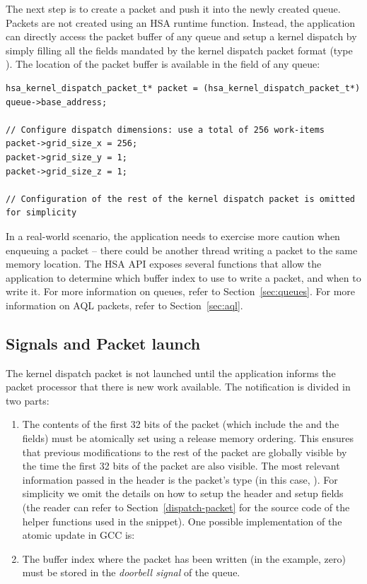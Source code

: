 \documentclass[final,oneside]{book}
\begin{document}
The next step is to create a packet and push it into the newly created
queue. Packets are not created using an HSA runtime function. Instead, the
application can directly access the packet buffer of any queue and setup a
kernel dispatch by simply filling all the fields mandated by the kernel dispatch
packet format (type ). The location of the
packet buffer is available in the  field of any
queue:
\begin{lstlisting}
hsa_kernel_dispatch_packet_t* packet = (hsa_kernel_dispatch_packet_t*) queue->base_address;

// Configure dispatch dimensions: use a total of 256 work-items
packet->grid_size_x = 256;
packet->grid_size_y = 1;
packet->grid_size_z = 1;

// Configuration of the rest of the kernel dispatch packet is omitted for simplicity
\end{lstlisting}

In a real-world scenario, the application needs to exercise more caution when
enqueuing a packet -- there could be another thread writing a packet to the same
memory location. The HSA API exposes several functions that allow the
application to determine which buffer index to use to write a packet, and when to
write it. For more information on queues, refer to Section~\ref{sec:queues}. For
more information on AQL packets, refer to Section~\ref{sec:aql}.

\subsection{Signals and Packet launch}
The kernel dispatch packet is not launched until the application informs the
packet processor that there is new work available. The notification is divided
in two parts:

\begin{enumerate}
\item The contents of the first 32 bits of the packet (which include the
   and the
   fields) must be atomically set
  using a release memory ordering. This ensures that previous modifications to
  the rest of the packet are globally visible by the time the first 32 bits of
  the packet are also visible. The most relevant information passed in the
  header is the packet's type (in this case,
  ). For simplicity we omit the details
  on how to setup the header and setup fields (the reader can refer to
  Section~\ref{dispatch-packet} for the source code of the helper functions used
  in the snippet).  One possible implementation of the atomic update in GCC
  is:
\item The buffer index where the packet has been written (in the example, zero)
must be stored in the \textit{doorbell signal} of the queue.
\end{enumerate}
\end{document}
